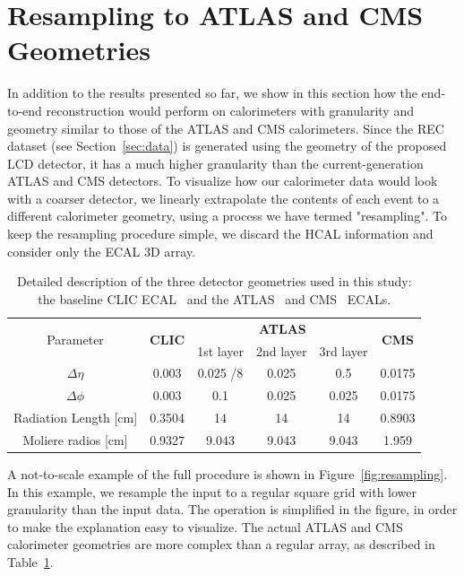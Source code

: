 \section{Resampling to ATLAS and CMS Geometries}\label{sec:resampling}

In addition to the results presented so far, we show in this section how the end-to-end reconstruction would perform on calorimeters with granularity and geometry similar to those of the ATLAS and CMS calorimeters. Since the REC dataset (see Section~\ref{sec:data}) is generated using the geometry of the proposed LCD detector, it has a much higher granularity than the current-generation ATLAS and CMS detectors. To visualize how our calorimeter data would look with a coarser detector, we linearly extrapolate the contents of each event to a different calorimeter geometry, using a process we have termed "resampling". To keep the resampling procedure simple, we discard the HCAL information and consider only the ECAL 3D array.

\begin{table}[tbp]
\centering
\caption{Detailed description of the three detector geometries used in this study: the baseline CLIC ECAL~\cite{CLIC_geometry} and the ATLAS~\cite{Aad:2008zzm} and CMS~\cite{Chatrchyan:2008aa} ECALs.\label{tab:resampling_geometry}}
\begin{tabular}{c|c|ccc|c}
\hline
\multirow{2}{*}{Parameter} & \multirow{2}{*}{\textbf{CLIC}} & \multicolumn{3}{c|}{\textbf{ATLAS}} & \multirow{2}{*}{\textbf{CMS}} \\
            &               & 1st layer & 2nd layer & 3rd layer & \\
\hline
$\Delta \eta$         & 0.003  & 0.025 /8 & 0.025 & 0.5   & 0.0175 \\
$\Delta \phi$         & 0.003  & 0.1      & 0.025 & 0.025 & 0.0175 \\
Radiation Length [cm] & 0.3504 & 14       & 14    & 14    & 0.8903 \\
Moliere radios [cm]   & 0.9327 & 9.043    & 9.043 & 9.043 & 1.959  \\
\hline 
\end{tabular}
\end{table}

A not-to-scale example of the full procedure is shown in Figure~\ref{fig:resampling}. In this example, we resample the input to a regular square grid with lower granularity than the input data. The operation is simplified in the figure, in order to make the explanation easy to visualize. The actual ATLAS and CMS calorimeter geometries are more complex than a regular array, as described in Table~\ref{tab:resampling_geometry}.

